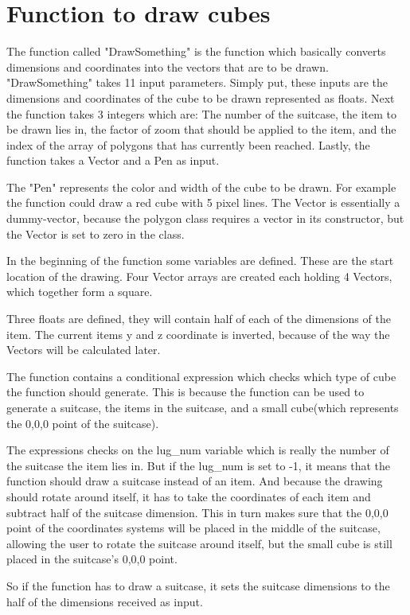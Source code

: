 \section{Function to draw cubes}
The function called "DrawSomething" is the function which basically converts dimensions and coordinates into the vectors that are to be drawn.
"DrawSomething" takes 11 input parameters. Simply put, these inputs are the dimensions and coordinates of the cube to be drawn represented as floats. Next the function takes 3 integers which are: The number of the suitcase, the item to be drawn lies in, the factor of zoom that should be applied to the item, and the index of the array of polygons that has currently been reached. Lastly, the function takes a Vector and a Pen as input.

The "Pen" represents the color and width of the cube to be drawn. For example the function could draw a red cube with 5 pixel lines. The Vector is essentially a dummy-vector, because the polygon class requires a vector in its constructor, but the Vector is set to zero in the class.

In the beginning of the function some variables are defined. These are the start location of the drawing. Four Vector arrays are created each holding 4 Vectors, which together form a square.

Three floats are defined, they will contain half of each of the dimensions of the item.
The current items y and z coordinate is inverted, because of the way the Vectors will be calculated later. 

The function contains a conditional expression which checks which type of cube the function should generate. This is because the function can be used to generate a suitcase, the items in the suitcase, and a small cube(which represents the 0,0,0 point of the suitcase). 

The expressions checks on the lug\_num variable which is really the number of the suitcase the item lies in. But if the lug\_num is set to -1, it means that the function should draw a suitcase instead of an item. And because the drawing should rotate around itself, it has to take the coordinates of each item and subtract half of the suitcase dimension. This in turn makes sure that the 0,0,0 point of the coordinates systems will be placed in the middle of the suitcase, allowing the user to rotate the suitcase around itself, but the small cube is still placed in the suitcase's 0,0,0 point.

So if the function has to draw a suitcase, it sets the suitcase dimensions to the half of the dimensions received as input.

